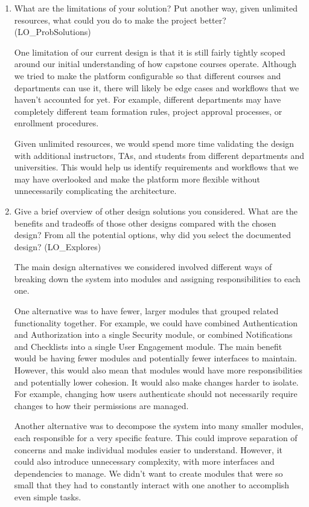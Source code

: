 \documentclass[12pt, titlepage]{article}
\begin{document}
\begin{enumerate}
  \item What are the limitations of your solution?  Put another way, given
  unlimited resources, what could you do to make the project better? (LO\_ProbSolutions)

  One limitation of our current design is that it is still fairly tightly scoped around our
  initial understanding of how capstone courses operate. Although we tried to make the platform
  configurable so that different courses and departments can use it, there will likely be edge cases
  and workflows that we haven't accounted for yet. For example, different departments may have
  completely different team formation rules, project approval processes, or enrollment procedures.

  Given unlimited resources, we would spend more time validating the design with additional instructors,
  TAs, and students from different departments and universities.
  This would help us identify requirements and workflows that we may have overlooked and make the
  platform more flexible without unnecessarily complicating the architecture.

  \item Give a brief overview of other design solutions you considered.  What
  are the benefits and tradeoffs of those other designs compared with the chosen
  design?  From all the potential options, why did you select the documented design?
  (LO\_Explores)

  The main design alternatives we considered involved different ways of breaking down the system into
  modules and assigning responsibilities to each one.

  One alternative was to have fewer, larger modules that grouped related functionality together.
  For example, we could have combined Authentication and Authorization into a single Security module,
  or combined Notifications and Checklists into a single User Engagement module.
  The main benefit would be having fewer modules and potentially fewer interfaces to maintain.
  However, this would also mean that modules would have more responsibilities and potentially lower cohesion.
  It would also make changes harder to isolate. For example, changing how users authenticate should not
  necessarily require changes to how their permissions are managed.

  Another alternative was to decompose the system into many smaller modules, each responsible for a very specific feature.
  This could improve separation of concerns and make individual modules easier to understand.
  However, it could also introduce unnecessary complexity, with more interfaces and dependencies to manage.
  We didn't want to create modules that were so small that they had to constantly interact with one another to
  accomplish even simple tasks.


\end{enumerate}
\end{document}
